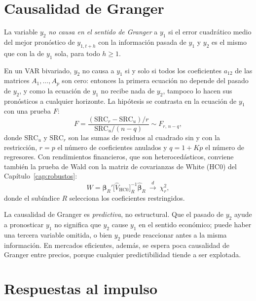 \section{Causalidad de Granger}

\begin{definicion}
La variable $y_2$ \emph{no causa en el sentido de Granger} a $y_1$ si el error cuadrático medio del mejor
pronóstico de $y_{1,t+h}$ con la información pasada de $y_1$ y $y_2$ es el mismo que con la de $y_1$ sola, para
todo $h\ge1$.
\end{definicion}

En un VAR bivariado, $y_2$ no causa a $y_1$ si y solo si todos los coeficientes $a_{12}$ de las matrices
$A_1,\dots,A_p$ son cero: entonces la primera ecuación no depende del pasado de $y_2$, y como la ecuación de
$y_1$ no recibe nada de $y_2$, tampoco lo hacen sus pronósticos a cualquier horizonte. La hipótesis se contrasta
en la ecuación de $y_1$ con una prueba $F$:
\[
  F=\frac{(\mathrm{SRC}_r-\mathrm{SRC}_u)/r}{\mathrm{SRC}_u/(n-q)}\sim F_{r,\,n-q},
\]
donde $\mathrm{SRC}_u$ y $\mathrm{SRC}_r$ son las sumas de residuos al cuadrado sin y con la restricción, $r=p$
el número de coeficientes anulados y $q=1+Kp$ el número de regresores. Con rendimientos financieros, que son
heterocedásticos, conviene también la prueba de Wald con la matriz de covarianzas de White (HC0) del
Capítulo~\ref{cap:robustos}:
\[
  W=\hat{\boldsymbol\beta}_R'\bigl[\hat V_{\text{HC0}}\bigr]_R^{-1}\hat{\boldsymbol\beta}_R\ \xrightarrow{d}\ \chi^2_r ,
\]
donde el subíndice $R$ selecciona los coeficientes restringidos.

\begin{observacion}
La causalidad de Granger es \emph{predictiva}, no estructural. Que el pasado de $y_2$ ayude a pronosticar $y_1$
no significa que $y_2$ cause $y_1$ en el sentido económico; puede haber una tercera variable omitida, o bien
$y_2$ puede reaccionar antes a la misma información. En mercados eficientes, además, se espera poca causalidad
de Granger entre precios, porque cualquier predictibilidad tiende a ser explotada.
\end{observacion}

\section{Respuestas al impulso}

